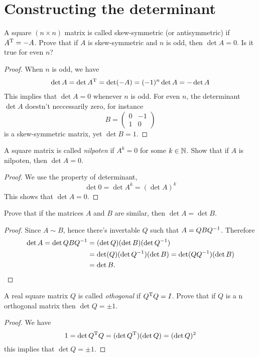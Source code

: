 \section{Constructing the determinant}
\setcounter{exercise}{3}
\begin{exercise}
  A square $(n\times n)$ matrix is called skew-symmetric 
  (or antisymmetric) if $A^\mathrm{T} = -A$. Prove that if $A$ is 
  skew-symmetric and $n$ is odd, then $\det A=0$. Is it
  true for even $n$?
\end{exercise}
\begin{proof}
  When $n$ is odd, we have
  \begin{align*}
    \det A=\det A^\mathrm{T}=\det (-A)=(-1)^n\det A=-\det A
  \end{align*}
  This implies that $\det A=0$ whenever $n$ is odd. For even $n$,
  the determinant $\det A$ doestn't neccessarily zero, for instance
  \[ B=\begin{pmatrix} 0&-1\\1&0 \end{pmatrix} \]
  is a skew-symmetric matrix, yet $\det B=1$.
\end{proof}
\begin{exercise}
  A square matrix is called \emph{nilpoten} if $A^k=0$
  for some $k\in\N$. Show that if $A$ is nilpoten, then
  $\det A=0$.
\end{exercise}
\begin{proof}
  We use the property of determinant,
  \[ \det 0=\det A^k=(\det A)^k \]
  This shows that $\det A=0$.
\end{proof}
\begin{exercise}
  Prove that if the matrices $A$ and $B$ are similar,
  then $\det A=\det B$.
\end{exercise}
\begin{proof}
  Since $A\sim B$, hence there's invertable $Q$ such that
  $A=QBQ^{-1}$. Therefore
  \begin{align*}
    \det A=\det QBQ^{-1}
    &=(\det Q)(\det B)(\det Q^{-1})\\
    &=\det(Q)(\det Q^{-1})(\det B)=\det(QQ^{-1})(\det B)\\
    &=\det B.
  \end{align*}
\end{proof}
\begin{exercise}
  A real square matrix $Q$ is called \emph{othogonal} if 
  $Q^\mathrm{T} Q=I$. Prove that if $Q$ is a n orthogonal matrix
  then $\det Q=\pm 1$.
\end{exercise}
\begin{proof}
  We have
  \[ 1=\det Q^\mathrm{T} Q=(\det Q^\mathrm{T})(\det Q)=(\det Q)^2 \]
  this implies that $\det Q=\pm 1.$
\end{proof}

